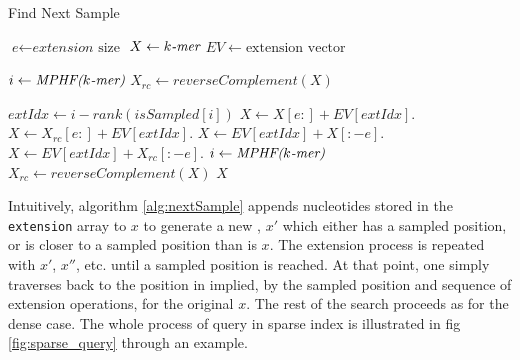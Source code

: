 \begin{algorithm}
\caption{Find Next Sample}\label{alg:nextSample}
\begin{algorithmic}[1]
\State $\textit{e} \gets \textit{extension} \text{ size}$
\State $X \gets \textit{$k$-mer}$
\State $EV \gets \text{extension vector}$

\State $i \gets \textit{MPHF($k$-mer)}$
\State $X_{rc} \gets \textit{reverseComplement}(X)$

\State $extIdx \gets i-rank(isSampled[i])$
\State $X \gets X[e:] + EV[extIdx]$.
\EndIf
{}
\State $X \gets X_{rc}[e:] + EV[extIdx]$.
\EndIf
{}
\State $X \gets EV[extIdx] + X[:-e]$.
\EndIf
{}
\State $X \gets EV[extIdx] + X_{rc}[:-e]$.
\EndIf
\State $i \gets \textit{MPHF($k$-mer)}$
\State $X_{rc} \gets \textit{reverseComplement}(X)$
\EndWhile
\Return $X$
\EndProcedure
\end{algorithmic}
\end{algorithm}


Intuitively, algorithm \ref{alg:nextSample} appends nucleotides stored in the
\texttt{extension} array to $x$ to generate a new \kmer, $x'$ which either has a
sampled position, or is closer to a sampled position than is $x$. The extension
process is repeated with $x'$, $x''$, etc. until a sampled position is reached.
At that point, one simply traverses back to the position in \cseq implied, by the
sampled position and sequence of extension operations, for the original \kmer
$x$. The rest of the search proceeds as for the dense case. The whole process of
\kmer query in sparse index is illustrated in fig \ref{fig:sparse_query} through an example.

